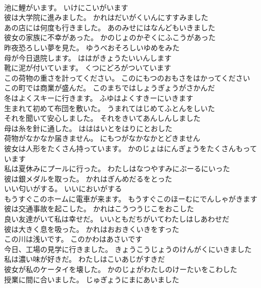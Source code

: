 \documentclass[8pt]{extreport}
\begin{document}
\begin{CJK}{UTF8}{min}
\\	池に鯉がいます。	いけにこいがいます 
\\	彼は大学院に進みました。	かれはだいがくいんにすすみました 
\\	あの店には何度も行きました。	あのみせにはなんどもいきました 
\\	彼女の家族に不幸があった。	かのじょのかぞくにふこうがあった 
\\	昨夜恐ろしい夢を見た。	ゆうべおそろしいゆめをみた 
\\	母が今日退院します。	ははがきょうたいいんします 
\\	靴に泥が付いています。	くつにどろがついています 
\\	この荷物の重さを計ってください。	このにもつのおもさをはかってください 
\\	この町では商業が盛んだ。	このまちではしょうぎょうがさかんだ 
\\	冬はよくスキーに行きます。	ふゆはよくすきーにいきます 
\\	生まれて初めて布団を敷いた。	うまれてはじめてふとんをしいた 
\\	それを聞いて安心しました。	それをきいてあんしんしました 
\\	母は糸を針に通した。	はははいとをはりにとおした 
\\	荷物がなかなか届きません。	にもつがなかなかとどきません 
\\	彼女は人形をたくさん持っています。	かのじょはにんぎょうをたくさんもっています 
\\	私は夏休みにプールに行った。	わたしはなつやすみにぷーるにいった 
\\	彼は銀メダルを取った。	かれはぎんめだるをとった 
\\	いい匂いがする。	いいにおいがする 
\\	もうすぐこのホームに電車が来ます。	もうすぐこのほーむにでんしゃがきます 
\\	彼は交通事故を起こした。	かれはこうつうじこをおこした 
\\	良い友達がいて私は幸せだ。	いいともだちがいてわたしはしあわせだ 
\\	彼は大きく息を吸った。	かれはおおきくいきをすった 
\\	この川は浅いです。	このかわはあさいです 
\\	今日、工場の見学に行きました。	きょうこうじょうのけんがくにいきました 
\\	私は濃い味が好きだ。	わたしはこいあじがすきだ 
\\	彼女が私のケータイを壊した。	かのじょがわたしのけーたいをこわした 
\\	授業に間に合いました。	じゅぎょうにまにあいました 

\end{CJK}
\end{document}
